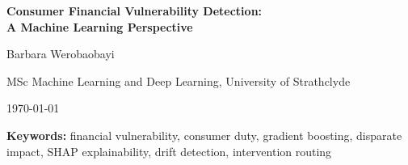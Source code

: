 \documentclass[12pt, a4paper]{article}
\begin{document}
\begin{titlepage}
\centering
\vspace*{2cm}

{\LARGE\bfseries Consumer Financial Vulnerability Detection:\\[6pt]
A Machine Learning Perspective\par}

\vspace{1.5cm}

{\large Barbara Werobaobayi\par}
{\normalsize MSc Machine Learning and Deep Learning, University of Strathclyde\par}

\vspace{0.8cm}

{\normalsize \today\par}

\vspace{2cm}

\begin{abstract}
\noindent
Consumer financial vulnerability is an underserved problem in applied machine learning.
Existing credit risk systems are designed to screen new applicants at origination,
leaving institutions with no systematic mechanism for identifying customers
who become vulnerable \emph{after} account opening --- a gap that acquired
regulatory urgency with the introduction of the UK Financial Conduct Authority's
Consumer Duty framework in July 2023.
This review surveys the academic and practitioner literature across six intersecting
domains: the conceptual framing of vulnerability as a predictive target; gradient
boosting methods as the production standard for tabular financial data;
hyperparameter optimisation with Bayesian search; class imbalance treatment;
model explainability and fairness auditing under regulatory constraint;
and the role of macroeconomic context in real-time risk scoring.
We conclude by identifying a persistent gap between regulatory obligation and deployed
capability, and situate \emph{FinWatch} --- a continuous vulnerability scoring
and intervention routing system --- as a direct response to that gap.
\end{abstract}

\vspace{1cm}

\noindent\textbf{Keywords:} financial vulnerability, consumer duty, gradient boosting,
disparate impact, SHAP explainability, drift detection, intervention routing

\vfill
\end{titlepage}
\end{document}
